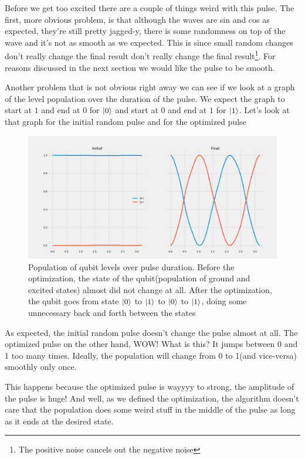 \documentclass[english, a4paper, 12pt, twoside]{article}
\numberwithin{equation}{section} %
\begin{document}
Before we get too excited there are a couple of things weird with this pulse. The first, more obvious problem, is that although the waves are sin and cos as expected, they're still pretty jagged-y, there is some randomness on top of the wave and it's not as smooth as we expected. This is since small random changes don't really change the final result don't really change the final result\footnote{The positive noise cancels out the negative noise}. For reasons discussed in the next section we would like the pulse to be smooth.

Another problem that is not obvious right away we can see if we look at a graph of the level population over the duration of the pulse. We expect the graph to start at $1$ and end at $0$ for $\ket{0}$ and start at $0$ and end at $1$ for $\ket{1}$. Let's look at that graph for the initial random pulse and for the optimized pulse
\begin{figure}[H]
    \centering
    \includegraphics[width=1\columnwidth]{Results/No-Constraints-single-qubit/level-population-pretty2.png}
    \caption{Population of qubit levels over pulse duration. Before the optimization, the state of the qubit(population of ground and excited states) almost did not change at all. After the optimization, the qubit goes from state $\ket{0}$ to $\ket{1}$ to $\ket{0}$ to $\ket{1}$, doing some unnecessary back and forth between the states}
    \label{fig:GRAPE-first-example-level-population}
\end{figure}  %
As expected, the initial random pulse doesn't change the pulse almost at all. The optimized pulse on the other hand, WOW! What is this? It jumps between 0 and 1 too many times. Ideally, the population will change from 0 to 1(and vice-versa) smoothly only once.

This happens because the optimized pulse is wayyyy to strong, the amplitude of the pulse is huge! And well, as we defined the optimization, the algorithm doesn't care that the population does some weird stuff in the middle of the pulse as long as it ends at the desired state.
\end{document}
